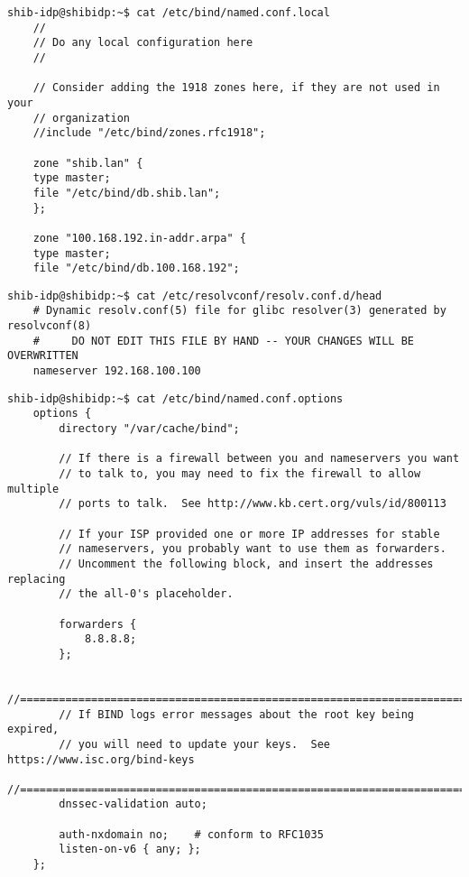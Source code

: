 \begin{lstlisting}
shib-idp@shibidp:~$ cat /etc/bind/named.conf.local 
	//
	// Do any local configuration here
	//

	// Consider adding the 1918 zones here, if they are not used in your
	// organization
	//include "/etc/bind/zones.rfc1918";

	zone "shib.lan" {
	type master;
	file "/etc/bind/db.shib.lan";
	};

	zone "100.168.192.in-addr.arpa" {
	type master;
	file "/etc/bind/db.100.168.192";
\end{lstlisting}
\begin{lstlisting}
shib-idp@shibidp:~$ cat /etc/resolvconf/resolv.conf.d/head
	# Dynamic resolv.conf(5) file for glibc resolver(3) generated by resolvconf(8)
	#     DO NOT EDIT THIS FILE BY HAND -- YOUR CHANGES WILL BE OVERWRITTEN
	nameserver 192.168.100.100
\end{lstlisting}
\begin{lstlisting}
shib-idp@shibidp:~$ cat /etc/bind/named.conf.options 
	options {
		directory "/var/cache/bind";

		// If there is a firewall between you and nameservers you want
		// to talk to, you may need to fix the firewall to allow multiple
		// ports to talk.  See http://www.kb.cert.org/vuls/id/800113

		// If your ISP provided one or more IP addresses for stable 
		// nameservers, you probably want to use them as forwarders.  
		// Uncomment the following block, and insert the addresses replacing 
		// the all-0's placeholder.

		forwarders {
			8.8.8.8;
		};

		//========================================================================
		// If BIND logs error messages about the root key being expired,
		// you will need to update your keys.  See https://www.isc.org/bind-keys
		//========================================================================
		dnssec-validation auto;

		auth-nxdomain no;    # conform to RFC1035
		listen-on-v6 { any; };
	};
\end{lstlisting}
